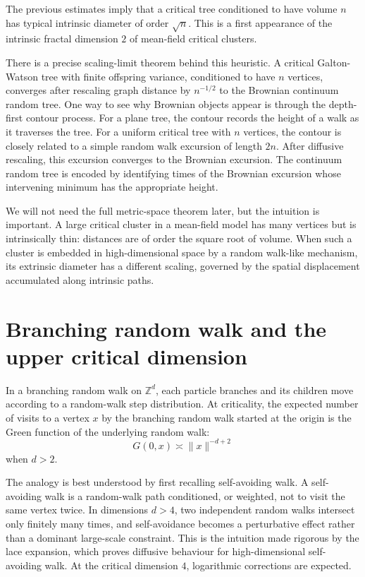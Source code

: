 \documentclass[11pt,reqno]{book}
\numberwithin{equation}{chapter}
\theoremstyle{plain}
\theoremstyle{definition}
\theoremstyle{remark}
\newcommand{\Z}{\mathbb Z}
\newcommand{\1}{\mathbf 1}
\newcommand{\norm}[1]{\lVert #1\rVert}
\newcommand{\as}{\asymp}
\begin{document}
The previous estimates imply that a critical tree conditioned to have volume $n$ has typical intrinsic diameter of order $\sqrt n$. This is a first appearance of the intrinsic fractal dimension $2$ of mean-field critical clusters.

There is a precise scaling-limit theorem behind this heuristic. A critical Galton-Watson tree with finite offspring variance, conditioned to have $n$ vertices, converges after rescaling graph distance by $n^{-1/2}$ to the Brownian continuum random tree. One way to see why Brownian objects appear is through the depth-first contour process. For a plane tree, the contour records the height of a walk as it traverses the tree. For a uniform critical tree with $n$ vertices, the contour is closely related to a simple random walk excursion of length $2n$. After diffusive rescaling, this excursion converges to the Brownian excursion. The continuum random tree is encoded by identifying times of the Brownian excursion whose intervening minimum has the appropriate height.

We will not need the full metric-space theorem later, but the intuition is important. A large critical cluster in a mean-field model has many vertices but is intrinsically thin: distances are of order the square root of volume. When such a cluster is embedded in high-dimensional space by a random walk-like mechanism, its extrinsic diameter has a different scaling, governed by the spatial displacement accumulated along intrinsic paths.

\section{Branching random walk and the upper critical dimension}

In a branching random walk on $\Z^d$, each particle branches and its children move according to a random-walk step distribution. At criticality, the expected number of visits to a vertex $x$ by the branching random walk started at the origin is the Green function of the underlying random walk:
\[
  G(0,x)\as \norm{x}^{-d+2}
\]
when $d>2$.

The analogy is best understood by first recalling self-avoiding walk. A self-avoiding walk is a random-walk path conditioned, or weighted, not to visit the same vertex twice. In dimensions $d>4$, two independent random walks intersect only finitely many times, and self-avoidance becomes a perturbative effect rather than a dominant large-scale constraint. This is the intuition made rigorous by the lace expansion, which proves diffusive behaviour for high-dimensional self-avoiding walk. At the critical dimension $4$, logarithmic corrections are expected.
\end{document}
